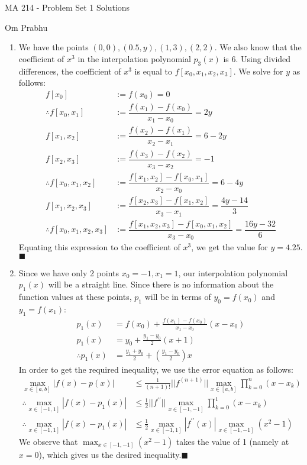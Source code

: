 \documentclass[a4paper, 11pt]{article}
\begin{document}
\begin{center}
	{\LARGE MA 214 - Problem Set 1 Solutions}
	\vspace{2mm}
	
	{\large Om Prabhu}
\end{center}
\begin{enumerate}[label=(\arabic*), leftmargin=*]
	\item We have the points $(0,0),(0.5,y),(1,3),(2,2)$. We also know that the coefficient of $x^3$ in the interpolation polynomial $p_3(x)$ is 6. Using divided differences, the coefficient of $x^3$ is equal to $f[x_0,x_1,x_2,x_3]$. We solve for $y$ as follows:
\begin{align*}
	f[x_0]&:=f(x_0)=0\\
	\therefore f[x_0,x_1]&:=\dfrac{f(x_1)-f(x_0)}{x_1-x_0}=2y\\
	f[x_1,x_2]&:=\dfrac{f(x_2)-f(x_1)}{x_2-x_1}=6-2y\\
	f[x_2,x_3]&:=\dfrac{f(x_3)-f(x_2)}{x_3-x_2}=-1\\
	\therefore f[x_0,x_1,x_2]&:=\dfrac{f[x_1,x_2]-f[x_0,x_1]}{x_2-x_0}=6-4y\\
	f[x_1,x_2,x_3]&:=\dfrac{f[x_2,x_3]-f[x_1,x_2]}{x_3-x_1}=\dfrac{4y-14}{3}\\
	\therefore f[x_0,x_1,x_2,x_3]&:=\dfrac{f[x_1,x_2,x_3]-f[x_0,x_1,x_2]}{x_3-x_0}=\dfrac{16y-32}{6}
\end{align*}
Equating this expression to the coefficient of $x^3$, we get the value for $y=4.25$.\hfill$\blacksquare$	

	\item Since we have only 2 points $x_0=-1,x_1=1$, our interpolation polynomial $p_1(x)$ will be a straight line. Since there is no information about the function values at these points, $p_1$ will be in terms of $y_0=f(x_0)$ and $y_1=f(x_1)$:
\begin{align*}
	p_1(x)&=f(x_0)+\frac{f(x_1)-f(x_0)}{x_1-x_0}(x-x_0)\\
	p_1(x)&=y_0+\frac{y_1-y_0}{2}(x+1)\\
	\therefore p_1(x)&=\frac{y_1+y_0}{2}+\left(\frac{y_1-y_0}{2}\right)x
\end{align*}
In order to get the required inequality, we use the error equation as follows:
\begin{align*}
	\max_{x\in[a,b]} |f(x)-p(x)| & \leqslant \frac{1}{(n+1)!} ||f^{(n+1)}|| \max_{x\in[a,b]} \prod_{k=0}^n (x-x_k)\\
	\therefore \max_{x\in[-1,1]} |f(x)-p_1(x)| & \leqslant \frac{1}{2} ||f^{\prime\prime}|| \max_{x\in[-1,-1]} \prod_{k=0}^1 (x-x_k)\\
	\therefore \max_{x\in[-1,1]} |f(x)-p_1(x)| & \leqslant \frac{1}{2} \max_{x\in[-1,1]}|f^{\prime\prime}(x)| \max_{x\in[-1,-1]} (x^2-1)
\end{align*}
We observe that $\displaystyle \max_{x\in[-1,-1]} (x^2-1)$ takes the value of 1 (namely at $x=0$), which gives us the desired inequality.\hfill$\blacksquare$
\newpage


\end{enumerate}
\end{document}
